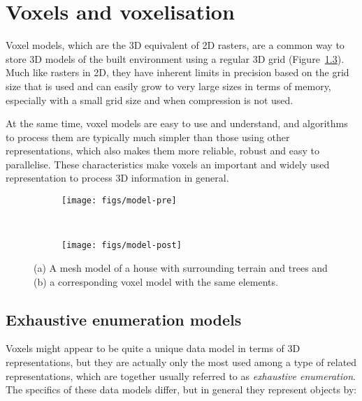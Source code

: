 
\setchapterpreamble[u]{\margintoc}

\graphicspath{{voxels/}}

\chapter{Voxels and voxelisation}%
\label{chap:voxels}

Voxel models, which are the 3D equivalent of 2D rasters, are a common way to store 3D models of the built environment using a regular 3D grid (Figure~\ref{fig:model}).
Much like rasters in 2D, they have inherent limits in precision based on the grid size that is used and can easily grow to very large sizes in terms of memory, especially with a small grid size and when compression is not used.

At the same time, voxel models are easy to use and understand, and algorithms to process them are typically much simpler than those using other representations, which also makes them more reliable, robust and easy to parallelise.
These characteristics make voxels an important and widely used representation to process 3D information in general.

\begin{figure}[htbp]
\centering
\begin{subfigure}[b]{\linewidth}
\texttt{[image: figs/model-pre]}
\caption{}%
\label{subfig:model-pre}
\end{subfigure}
\\
\begin{subfigure}[b]{\linewidth}
\texttt{[image: figs/model-post]}
\caption{}%
\label{subfig:model-post}
\end{subfigure}
\caption{(a) A mesh model of a house with surrounding terrain and trees and (b) a corresponding voxel model with the same elements.}%
\label{fig:model}
\end{figure}

\section{Exhaustive enumeration models}

Voxels might appear to be quite a unique data model in terms of 3D representations, but they are actually only the most used among a type of related representations, which are together usually referred to as \emph{exhaustive enumeration}.
The specifics of these data models differ, but in general they represent objects by:

